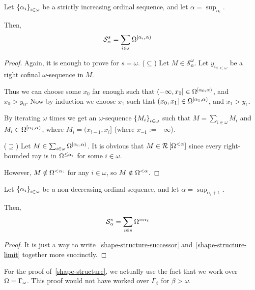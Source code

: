 \begin{lemma}\label{shape-structure-limit}
  Let $\left\{ {\alpha_i} \right\}_{i \in \omega}$ be a strictly
  increasing ordinal sequence, and let $\alpha = \sup_{\alpha_i}$.

  Then,
  \[
    \mathcal{S}^{s}_{\alpha} = \sum_{i \in s}{\Omega^{[\alpha_i, \alpha)}}
  \]
\end{lemma}

\begin{proof}
  Again, it is enough to prove for $s = \omega$.
  ($\subseteq$) Let $M \in \mathcal{S}^{\omega}_{\alpha}$.
  Let ${y_i}_{i < \omega}$ be a right cofinal $\omega$-sequence in $M$.

  Thus we can choose some $x_0$ far enough such that $(-\infty, x_0] \in \Omega^{[\alpha_0, \alpha)}$,
  and $x_0 > y_0$.
  Now by induction we choose $x_1$ such that $(x_0, x_1] \in \Omega^{[\alpha_1, \alpha)}$,
  and $x_1 > y_1$.

  By iterating $\omega$ times we get an $\omega$-sequence $\left\{ {M_i} \right\}_{i \in \omega}$
  such that $M = \sum_{i \in \omega} M_i$ and $M_i \in \Omega^{[\alpha_i, \alpha)}$,
  where $M_i = (x_{i-1}, x_i]$ (where $x_{-1} := -\infty$).


  ($\supseteq$) Let $M \in \sum_{i \in \omega}{\Omega^{[\alpha_i, \alpha)}}$.
  It is obvious that $M \in \mathcal{R} \left[ {{\Omega^{< \alpha}}} \right]$ since every right-bounded
  ray is in $\Omega^{\le \alpha_i}$ for some $i \in \omega$.

  However, $M \notin \Omega^{< \alpha_i}$ for any $i \in \omega$, so $M \notin \Omega^{< \alpha}$.


\end{proof}

\begin{lemma}\label{shape-structure}
  Let $\left\{ {\alpha_i} \right\}_{i \in \omega}$ be a non-decreasing ordinal sequence,
  and let $\alpha = \sup_{\alpha_i + 1}$.

  Then,
  \[
    \mathcal{S}^{s}_{\alpha} = \sum_{i \in s}{\Omega^{= \alpha_i}}
  \]
\end{lemma}

\begin{proof}
  It is just a way to write~\cref{shape-structure-successor} and~\cref{shape-structure-limit}
  together more succinctly.
\end{proof}

\begin{note}
  For the proof of~\cref{shape-structure}, we actually use the fact that
  we work over $\Omega = \Gamma_{\omega}$. This proof would not have worked over $\Gamma_{\beta}$
  for $\beta > \omega$.
\end{note}

